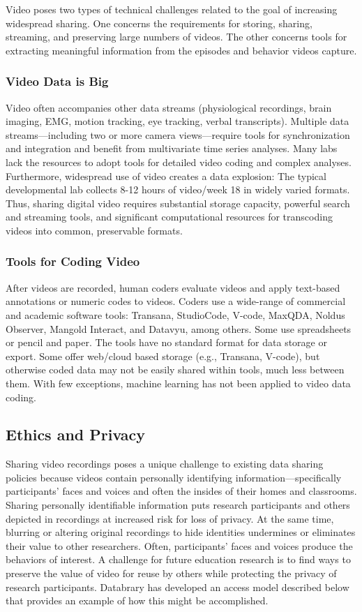 \documentclass[letterpaper,man,natbib]{apa6}
\begin{document}
Video poses two types of technical challenges related to the goal of increasing widespread sharing. One concerns the requirements for storing, sharing, streaming, and preserving large numbers of videos. The other concerns tools for extracting meaningful information from the episodes and behavior videos capture.

\subsubsection{Video Data is Big}

 

Video often accompanies other data streams (physiological recordings, brain imaging, EMG, motion tracking, eye tracking, verbal transcripts). 
Multiple data streams—including two or more camera views—require tools for synchronization and integration and benefit from multivariate time series analyses. 
Many labs lack the resources to adopt tools for detailed video coding and complex analyses. 
Furthermore, widespread use of video creates a data explosion: The typical developmental lab collects 8-12 hours of video/week 18 in widely varied formats. 
Thus, sharing digital video requires substantial storage capacity, powerful search and streaming tools, and significant computational resources for transcoding videos into common, preservable formats. 

\subsubsection{Tools for Coding Video}
After videos are recorded, human coders evaluate videos and apply text-based annotations or numeric codes to videos.
Coders use a wide-range of commercial and academic software tools: Transana, StudioCode, V-code, MaxQDA, Noldus Observer, Mangold Interact, and Datavyu, among others.
Some use spreadsheets or pencil and paper.
The tools have no standard format for data storage or export.
Some offer web/cloud based storage (e.g., Transana, V-code), but otherwise coded data may not be easily shared within tools, much less between them.
With few exceptions, machine learning has not been applied to video data coding.
\subsection{Ethics and Privacy}
Sharing video recordings poses a unique challenge to existing data sharing policies because videos contain personally identifying information—specifically participants’ faces and voices and often the
insides of their homes and classrooms. 
Sharing personally identifiable information puts research participants and others depicted in recordings at increased risk for loss of privacy. 
At the same time, blurring or altering original recordings to hide identities undermines or eliminates
their value to other researchers. 
Often, participants’ faces and voices produce the behaviors of interest.
A challenge for future education research is to find ways to preserve the value of video for reuse by others while protecting the privacy of research participants.
Databrary has developed an access model described below that provides an example of how this might be accomplished.
\end{document}
